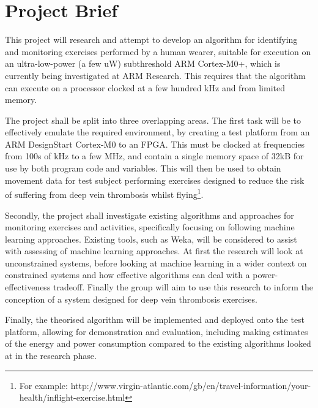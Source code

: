 \chapter{Project Brief}

This project will research and attempt to develop an algorithm for identifying and monitoring exercises performed by a human wearer, suitable for execution on an ultra-low-power (a few uW) subthreshold ARM Cortex-M0+, which is currently being investigated at ARM Research. This requires that the algorithm can execute on a processor clocked at a few hundred kHz and from limited memory.

The project shall be split into three overlapping areas. The first task will be to effectively emulate the required environment, by creating a test platform from an ARM DesignStart Cortex-M0 to an FPGA. This must be clocked at frequencies from 100s of kHz to a few MHz, and contain a single memory space of 32kB for use by both program code and variables. This will then be used to obtain movement data for test subject performing exercises designed to reduce the risk of suffering from deep vein thrombosis whilst flying\footnote{For example: http://www.virgin-atlantic.com/gb/en/travel-information/your-health/inflight-exercise.html}.

Secondly, the project shall investigate existing algorithms and approaches for monitoring exercises and activities, specifically focusing on following machine learning approaches. Existing tools, such as Weka, will be considered to assist with assessing of machine learning approaches. At first the research will look at unconstrained systems, before looking at machine learning in a wider context on constrained systems and how effective algorithms can deal with a power-effectiveness tradeoff. Finally the group will aim to use this research to inform the conception of a system designed for deep vein thrombosis exercises.

Finally, the theorised algorithm will be implemented and deployed onto the test platform, allowing for demonstration and evaluation, including making estimates of the energy and power consumption compared to the existing algorithms looked at in the research phase.